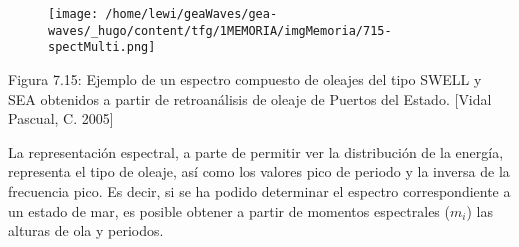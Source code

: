 \begin{figure}
\centering
\texttt{[image: /home/lewi/geaWaves/gea-waves/\_hugo/content/tfg/1MEMORIA/imgMemoria/715-spectMulti.png]}
\caption{}
\end{figure}

Figura 7.15: Ejemplo de un espectro compuesto de oleajes del tipo SWELL
y SEA obtenidos a partir de retroanálisis de oleaje de Puertos del
Estado. {[}Vidal Pascual, C. 2005{]}

La representación espectral, a parte de permitir ver la distribución de
la energía, representa el tipo de oleaje, así como los valores pico de
periodo y la inversa de la frecuencia pico. Es decir, si se ha podido
determinar el espectro correspondiente a un estado de mar, es posible
obtener a partir de momentos espectrales (\(m_i\)) las alturas de ola y
periodos.
